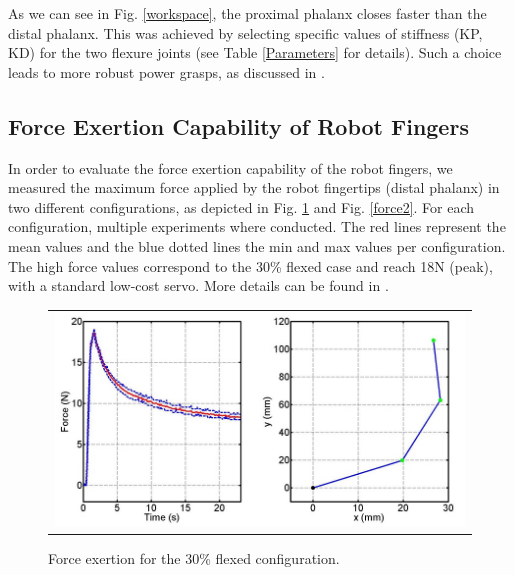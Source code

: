 As we can see in Fig. \ref{workspace}, the proximal phalanx closes faster than the distal phalanx. This was achieved by selecting specific values of stiffness (KP, KD) for the two flexure joints (see Table \ref{Parameters} for details). Such a choice leads to more robust power grasps, as discussed in \cite{DollarTM2006}.

\vspace{1cm}

\subsection{Force Exertion Capability of Robot Fingers}
In order to evaluate the force exertion capability of the robot fingers, we measured the maximum force applied by the robot fingertips (distal phalanx) in two different configurations, as depicted in Fig. \ref{force1} and Fig. \ref{force2}. For each configuration, multiple experiments where conducted. The red lines represent the mean values and the blue dotted lines the min and max values per configuration. The high force values correspond to the 30\% flexed case and reach 18N (peak), with a standard low-cost servo. More details can be found in \cite{Zisimatos2014IROS}.

\begin{figure}[h!]
\begin{center}
\begin{tabular}{  c  }
\includegraphics[width=12cm]{figures/Intro/Fig1-7.jpg}
\end{tabular}
\end{center}
\caption{Force exertion for the 30\% flexed configuration.}
\label{force1}
\end{figure}

